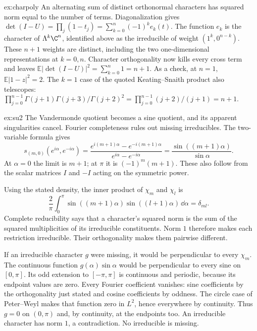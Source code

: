 \begin{solution}{ex:charpoly}
\idea An alternating sum of distinct orthonormal characters has squared norm equal to the number of terms.
\writeup Diagonalization gives
$\det(I-U)=\prod_j(1-t_j)=\sum_{k=0}^n(-1)^ke_k(t)$.
The function $e_k$ is the character of $\Lambda^k\C^n$, identified above as the irreducible of weight $(1^k,0^{n-k})$. These $n+1$ weights are distinct, including the two one-dimensional representations at $k=0,n$. Character orthogonality now kills every cross term and leaves
$\mathbb E|\det(I-U)|^2=\sum_{k=0}^n1=n+1$.
As a check, at $n=1$, $\mathbb E|1-z|^2=2$. The $k=1$ case of the quoted Keating--Snaith product also telescopes:
$\prod_{j=0}^{n-1}\Gamma(j+1)\Gamma(j+3)/\Gamma(j+2)^2
=\prod_{j=0}^{n-1}(j+2)/(j+1)=n+1$.
\end{solution}

\begin{solution}{ex:su2}
\idea The Vandermonde quotient becomes a sine quotient, and its apparent singularities cancel. Fourier completeness rules out missing irreducibles.
\writeup The two-variable formula gives
\[
s_{(m,0)}(e^{i\alpha},e^{-i\alpha})
=\frac{e^{i(m+1)\alpha}-e^{-i(m+1)\alpha}}
 {e^{i\alpha}-e^{-i\alpha}}
=\frac{\sin((m+1)\alpha)}{\sin\alpha}.
\]
At $\alpha=0$ the limit is $m+1$; at $\pi$ it is $(-1)^m(m+1)$. These also follow from the scalar matrices $I$ and $-I$ acting on the symmetric power.

Using the stated density, the inner product of $\chi_m$ and $\chi_l$ is
\[
\frac2\pi\int_0^\pi\sin((m+1)\alpha)\sin((l+1)\alpha)\,\dd\alpha
=\delta_{ml}.
\]
Complete reducibility says that a character's squared norm is the sum of the squared multiplicities of its irreducible constituents. Norm $1$ therefore makes each restriction irreducible. Their orthogonality makes them pairwise different.

If an irreducible character $g$ were missing, it would be perpendicular to every $\chi_m$. The continuous function $g(\alpha)\sin\alpha$ would be perpendicular to every sine on $[0,\pi]$. Its odd extension to $[-\pi,\pi]$ is continuous and periodic, because its endpoint values are zero. Every Fourier coefficient vanishes: sine coefficients by the orthogonality just stated and cosine coefficients by oddness. The circle case of Peter--Weyl makes that function zero in $L^2$, hence everywhere by continuity. Thus $g=0$ on $(0,\pi)$ and, by continuity, at the endpoints too. An irreducible character has norm $1$, a contradiction. No irreducible is missing.
\end{solution}

